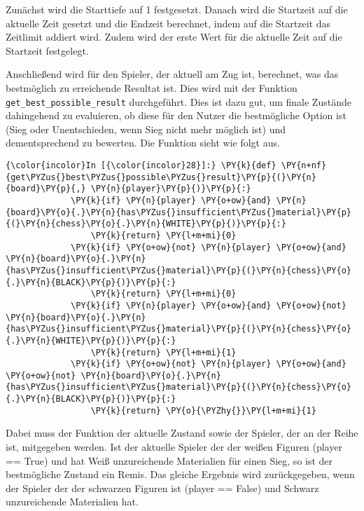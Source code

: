     Zunächst wird die Starttiefe auf 1 festgesetzt. Danach wird die
Startzeit auf die aktuelle Zeit gesetzt und die Endzeit berechnet, indem
auf die Startzeit das Zeitlimit addiert wird. Zudem wird der erste Wert
für die aktuelle Zeit auf die Startzeit festgelegt.

Anschließend wird für den Spieler, der aktuell am Zug ist, berechnet,
was das bestmöglich zu erreichende Resultat ist. Dies wird mit der
Funktion \texttt{get\_best\_possible\_result} durchgeführt. Dies ist
dazu gut, um finale Zustände dahingehend zu evaluieren, ob diese für den
Nutzer die bestmögliche Option ist (Sieg oder Unentschieden, wenn Sieg
nicht mehr möglich ist) und dementsprechend zu bewerten. Die Funktion
sieht wie folgt aus.

    \begin{Verbatim}[commandchars=\\\{\}]
{\color{incolor}In [{\color{incolor}28}]:} \PY{k}{def} \PY{n+nf}{get\PYZus{}best\PYZus{}possible\PYZus{}result}\PY{p}{(}\PY{n}{board}\PY{p}{,} \PY{n}{player}\PY{p}{)}\PY{p}{:}
             \PY{k}{if} \PY{n}{player} \PY{o+ow}{and} \PY{n}{board}\PY{o}{.}\PY{n}{has\PYZus{}insufficient\PYZus{}material}\PY{p}{(}\PY{n}{chess}\PY{o}{.}\PY{n}{WHITE}\PY{p}{)}\PY{p}{:}
                 \PY{k}{return} \PY{l+m+mi}{0}
             \PY{k}{if} \PY{o+ow}{not} \PY{n}{player} \PY{o+ow}{and} \PY{n}{board}\PY{o}{.}\PY{n}{has\PYZus{}insufficient\PYZus{}material}\PY{p}{(}\PY{n}{chess}\PY{o}{.}\PY{n}{BLACK}\PY{p}{)}\PY{p}{:}
                 \PY{k}{return} \PY{l+m+mi}{0}
             \PY{k}{if} \PY{n}{player} \PY{o+ow}{and} \PY{o+ow}{not} \PY{n}{board}\PY{o}{.}\PY{n}{has\PYZus{}insufficient\PYZus{}material}\PY{p}{(}\PY{n}{chess}\PY{o}{.}\PY{n}{WHITE}\PY{p}{)}\PY{p}{:}
                 \PY{k}{return} \PY{l+m+mi}{1}
             \PY{k}{if} \PY{o+ow}{not} \PY{n}{player} \PY{o+ow}{and} \PY{o+ow}{not} \PY{n}{board}\PY{o}{.}\PY{n}{has\PYZus{}insufficient\PYZus{}material}\PY{p}{(}\PY{n}{chess}\PY{o}{.}\PY{n}{BLACK}\PY{p}{)}\PY{p}{:}
                 \PY{k}{return} \PY{o}{\PYZhy{}}\PY{l+m+mi}{1}
\end{Verbatim}

    Dabei muss der Funktion der aktuelle Zustand sowie der Spieler, der an
der Reihe ist, mitgegeben werden. Ist der aktuelle Spieler der der
weißen Figuren (player == True) und hat Weiß unzureichende Materialien
für einen Sieg, so ist der bestmögliche Zustand ein Remis. Das gleiche
Ergebnis wird zurückgegeben, wenn der Spieler der der schwarzen Figuren
ist (player == False) und Schwarz unzureichende Materialien hat.


